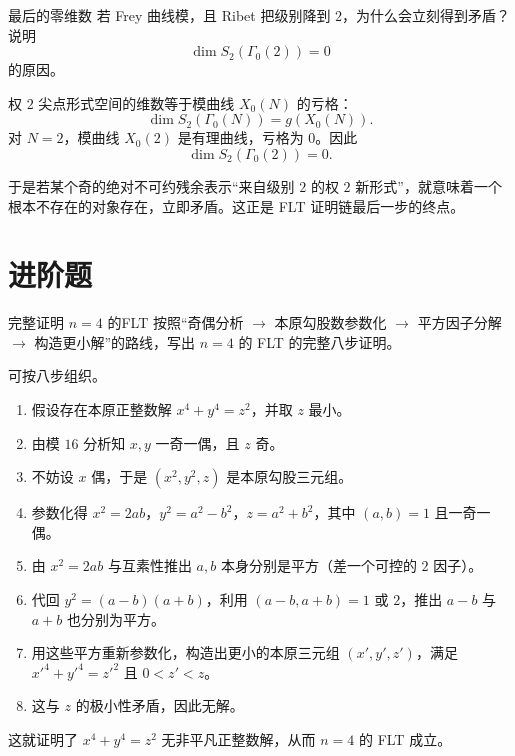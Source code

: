 \begin{problem}{最后的零维数}
若 Frey 曲线模，且 Ribet 把级别降到 $2$，为什么会立刻得到矛盾？说明
\[
\dim S_2(\Gamma_0(2))=0
\]
的原因。
\end{problem}
\begin{solution}
权 $2$ 尖点形式空间的维数等于模曲线 $X_0(N)$ 的亏格：
\[
\dim S_2(\Gamma_0(N))=g(X_0(N)).
\]
对 $N=2$，模曲线 $X_0(2)$ 是有理曲线，亏格为 $0$。因此
\[
\dim S_2(\Gamma_0(2))=0.
\]

于是若某个奇的绝对不可约残余表示“来自级别 $2$ 的权 $2$ 新形式”，就意味着一个根本不存在的对象存在，立即矛盾。这正是 FLT 证明链最后一步的终点。
\end{solution}

\section{进阶题 \medium}

\begin{problem}{完整证明 $n=4$ 的FLT}
按照“奇偶分析 $\to$ 本原勾股数参数化 $\to$ 平方因子分解 $\to$ 构造更小解”的路线，写出 $n=4$ 的 FLT 的完整八步证明。
\end{problem}
\begin{solution}
可按八步组织。
\begin{enumerate}[label=\textbf{第\arabic*步：}]
  \item 假设存在本原正整数解 $x^4+y^4=z^2$，并取 $z$ 最小。
  \item 由模 $16$ 分析知 $x,y$ 一奇一偶，且 $z$ 奇。
  \item 不妨设 $x$ 偶，于是 $(x^2,y^2,z)$ 是本原勾股三元组。
  \item 参数化得 $x^2=2ab$，$y^2=a^2-b^2$，$z=a^2+b^2$，其中 $(a,b)=1$ 且一奇一偶。
  \item 由 $x^2=2ab$ 与互素性推出 $a,b$ 本身分别是平方（差一个可控的 $2$ 因子）。
  \item 代回 $y^2=(a-b)(a+b)$，利用 $(a-b,a+b)=1$ 或 $2$，推出 $a-b$ 与 $a+b$ 也分别为平方。
  \item 用这些平方重新参数化，构造出更小的本原三元组 $(x',y',z')$，满足 $x'^4+y'^4=z'^2$ 且 $0<z'<z$。
  \item 这与 $z$ 的极小性矛盾，因此无解。
\end{enumerate}
这就证明了 $x^4+y^4=z^2$ 无非平凡正整数解，从而 $n=4$ 的 FLT 成立。
\end{solution}

